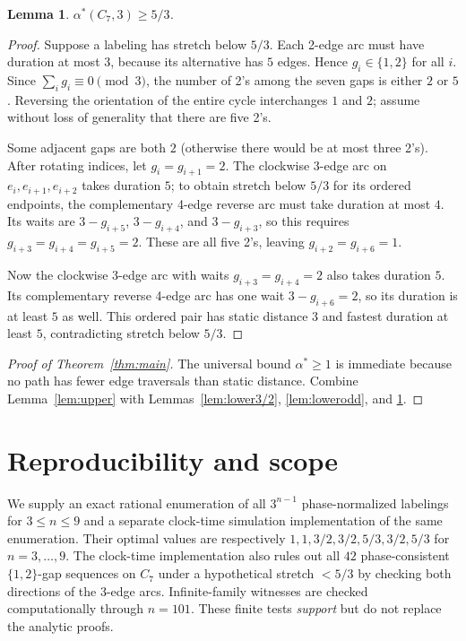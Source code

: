 \documentclass[10pt,a4paper]{article}
\newtheorem{lemma}{Lemma}
\newcommand{\opt}{\alpha^*}
\begin{document}
\begin{lemma}\label{lem:lower7}
$\opt(C_7,3)\ge5/3$.
\end{lemma}
\begin{proof}
Suppose a labeling has stretch below $5/3$. Each 2-edge arc must have duration at most $3$, because its alternative has $5$ edges. Hence $g_i\in\{1,2\}$ for all $i$. Since $\sum_i g_i\equiv0\pmod3$, the number of 2's among the seven gaps is either $2$ or $5$. Reversing the orientation of the entire cycle interchanges $1$ and $2$; assume without loss of generality that there are five 2's.

Some adjacent gaps are both $2$ (otherwise there would be at most three 2's). After rotating indices, let $g_i=g_{i+1}=2$. The clockwise 3-edge arc on $e_i,e_{i+1},e_{i+2}$ takes duration $5$; to obtain stretch below $5/3$ for its ordered endpoints, the complementary 4-edge reverse arc must take duration at most $4$. Its waits are $3-g_{i+5}$, $3-g_{i+4}$, and $3-g_{i+3}$, so this requires $g_{i+3}=g_{i+4}=g_{i+5}=2$. These are all five 2's, leaving $g_{i+2}=g_{i+6}=1$.

Now the clockwise 3-edge arc with waits $g_{i+3}=g_{i+4}=2$ also takes duration $5$. Its complementary reverse 4-edge arc has one wait $3-g_{i+6}=2$, so its duration is at least $5$ as well. This ordered pair has static distance $3$ and fastest duration at least $5$, contradicting stretch below $5/3$.
\end{proof}

\begin{proof}[Proof of Theorem~\ref{thm:main}]
The universal bound $\opt\ge1$ is immediate because no path has fewer edge traversals than static distance. Combine Lemma~\ref{lem:upper} with Lemmas~\ref{lem:lower3/2}, \ref{lem:lowerodd}, and \ref{lem:lower7}.
\end{proof}

\section{Reproducibility and scope}
We supply an exact rational enumeration of all $3^{n-1}$ phase-normalized labelings for $3\le n\le9$ and a separate clock-time simulation implementation of the same enumeration. Their optimal values are respectively $1,1,3/2,3/2,5/3,3/2,5/3$ for $n=3,\ldots,9$. The clock-time implementation also rules out all $42$ phase-consistent $\{1,2\}$-gap sequences on $C_7$ under a hypothetical stretch $<5/3$ by checking both directions of the 3-edge arcs. Infinite-family witnesses are checked computationally through $n=101$. These finite tests \emph{support} but do not replace the analytic proofs.
\end{document}
